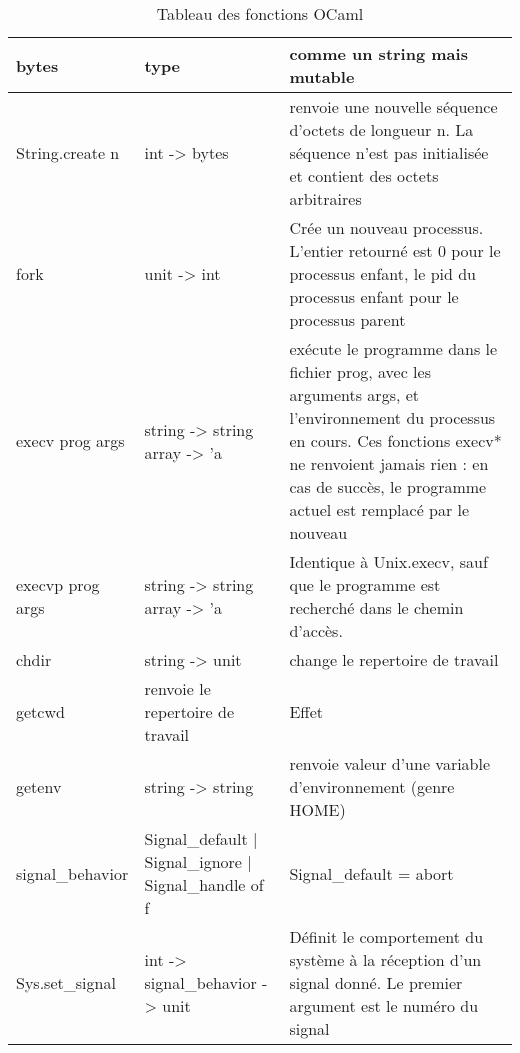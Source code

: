 \documentclass{article}
\begin{document}
\begin{table}[htbp]
\begin{tabular}{|p{4cm}|p{3cm}|p{7cm}|}
        \hline
        bytes & type & comme un string mais mutable \\ 
        \hline 
        String.create n & int -> bytes & renvoie une nouvelle séquence d'octets de longueur n. La séquence n'est pas initialisée et contient des octets arbitraires \\ 
        \hline 
        fork & unit -> int & Crée un nouveau processus. L'entier retourné est 0 pour le processus enfant, le pid du processus enfant pour le processus parent \\ 
        \hline 
        execv prog args & string -> string array -> 'a & exécute le programme dans le fichier prog, avec les arguments args, et l'environnement du processus en cours. Ces fonctions execv* ne renvoient jamais rien : en cas de succès, le programme actuel est remplacé par le nouveau \\ 
        \hline 
        execvp prog args & string -> string array -> 'a & Identique à Unix.execv, sauf que le programme est recherché dans le chemin d'accès. \\ 
        \hline 
        chdir & string -> unit & change le repertoire de travail \\ 
        \hline 
        getcwd & renvoie le repertoire de travail & Effet \\ 
        \hline 
        getenv & string -> string & renvoie valeur d'une variable d'environnement (genre HOME) \\ 
        \hline 
        signal\_behavior & Signal\_default | Signal\_ignore | Signal\_handle of f & Signal\_default = abort \\ 
        \hline 
        Sys.set\_signal & int -> signal\_behavior -> unit & Définit le comportement du système à la réception d'un signal donné. Le premier argument est le numéro du signal \\ 
        \hline 
    \end{tabular}
    \caption{Tableau des fonctions OCaml}
    \label{tab:tableau1} 
\end{table}
\end{document}
